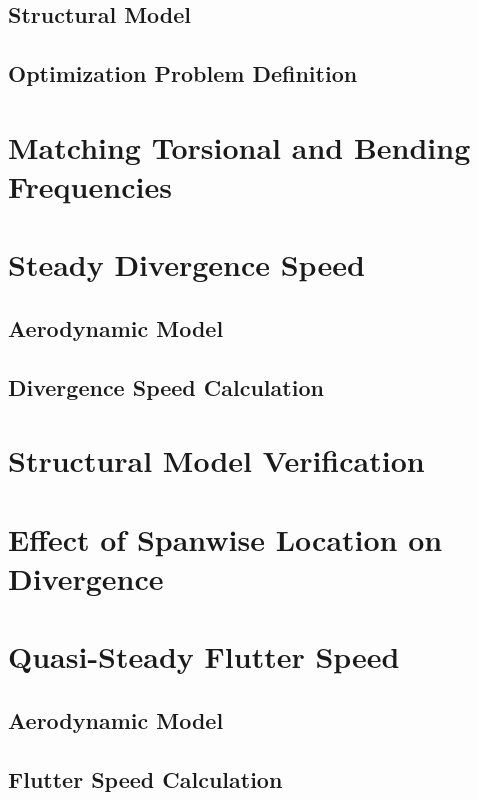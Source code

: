 \subsection{Structural Model}

\subsection{Optimization Problem Definition}

\section{Matching Torsional and Bending Frequencies}

\section{Steady Divergence Speed}

\subsection{Aerodynamic Model}

\subsection{Divergence Speed Calculation}

\section{Structural Model Verification}

\section{Effect of Spanwise Location on Divergence}

\section{Quasi-Steady Flutter Speed}

\subsection{Aerodynamic Model}

\subsection{Flutter Speed Calculation}

